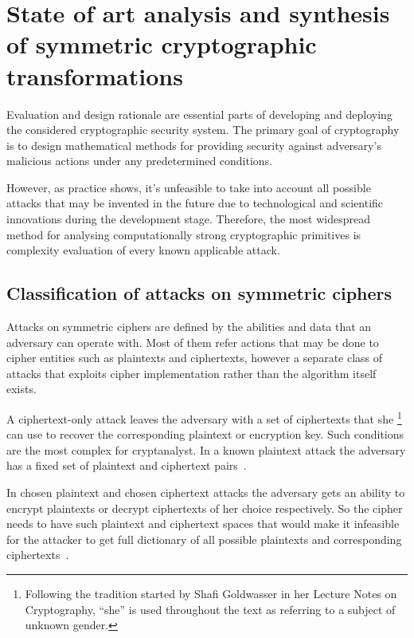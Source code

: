 %

\chapter{State of art analysis and synthesis of symmetric cryptographic transformations}
\label{sec:symmetry_review}

Evaluation and design rationale are essential parts of developing and
deploying  the considered cryptographic security system. The primary goal of
cryptography is to design mathematical methods for providing security against
adversary's malicious actions under any predetermined conditions.

However, as practice shows, it's unfeasible to take into account all possible
attacks that may be invented in the future due to technological and scientific
innovations during the development stage. Therefore, the most widespread 
method for analysing computationally strong cryptographic primitives is
complexity evaluation of every known applicable attack.

\section{Classification of attacks on symmetric ciphers}

Attacks on symmetric ciphers are defined by the abilities and data
that an adversary can operate with. Most of them refer actions that may be
done to cipher entities such as plaintexts and ciphertexts, however a separate
class of attacks that exploits cipher implementation rather than the
algorithm itself exists.

A ciphertext-only attack leaves the adversary with a set of ciphertexts that
she
\footnote{Following the tradition started by Shafi Goldwasser in her Lecture
Notes on Cryptography, ``she'' is used throughout the text as referring to a
subject of unknown gender.}
can use to recover the corresponding plaintext or encryption key. Such
conditions are the most complex for cryptanalyst. In a known plaintext attack
the adversary has a fixed set of plaintext and ciphertext
pairs~\cite{menezes:applied_cryptography}.

In chosen plaintext and chosen ciphertext attacks the adversary gets an
ability to encrypt plaintexts or decrypt ciphertexts of her choice
respectively. So the cipher needs to have such plaintext and ciphertext
spaces that would make it infeasible for the attacker to get full dictionary of
all possible plaintexts and corresponding
ciphertexts~\cite{menezes:applied_cryptography}. 


